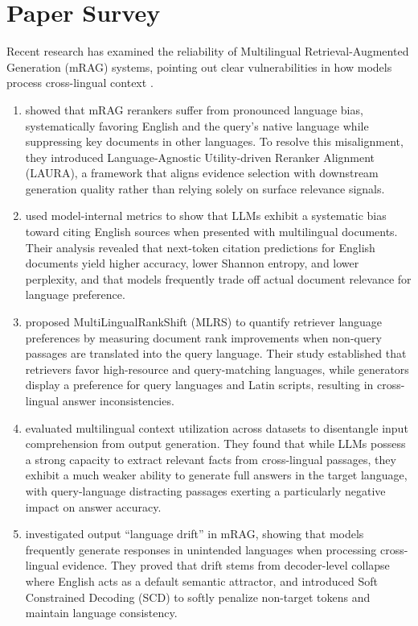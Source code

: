 \section{Paper Survey}
\label{sec:paper_survey}

Recent research has examined the reliability of Multilingual Retrieval-Augmented Generation (mRAG) systems, pointing out clear vulnerabilities in how models process cross-lingual context \parencite{ki2025,li2025,park2025,qi2025,wang2026}.

\begin{enumerate}
    \item \textcite{wang2026} showed that mRAG rerankers suffer from pronounced language bias, systematically favoring English and the query's native language while suppressing key documents in other languages. To resolve this misalignment, they introduced Language-Agnostic Utility-driven Reranker Alignment (LAURA), a framework that aligns evidence selection with downstream generation quality rather than relying solely on surface relevance signals.
    
    \item \textcite{ki2025} used model-internal metrics to show that LLMs exhibit a systematic bias toward citing English sources when presented with multilingual documents. Their analysis revealed that next-token citation predictions for English documents yield higher accuracy, lower Shannon entropy, and lower perplexity, and that models frequently trade off actual document relevance for language preference.
    
    \item \textcite{park2025} proposed MultiLingualRankShift (MLRS) to quantify retriever language preferences by measuring document rank improvements when non-query passages are translated into the query language. Their study established that retrievers favor high-resource and query-matching languages, while generators display a preference for query languages and Latin scripts, resulting in cross-lingual answer inconsistencies.
    
    \item \textcite{qi2025} evaluated multilingual context utilization across datasets to disentangle input comprehension from output generation. They found that while LLMs possess a strong capacity to extract relevant facts from cross-lingual passages, they exhibit a much weaker ability to generate full answers in the target language, with query-language distracting passages exerting a particularly negative impact on answer accuracy.

    \item \textcite{li2025} investigated output \enquote{language drift} in mRAG, showing that models frequently generate responses in unintended languages when processing cross-lingual evidence. They proved that drift stems from decoder-level collapse where English acts as a default semantic attractor, and introduced Soft Constrained Decoding (SCD) to softly penalize non-target tokens and maintain language consistency.
\end{enumerate}